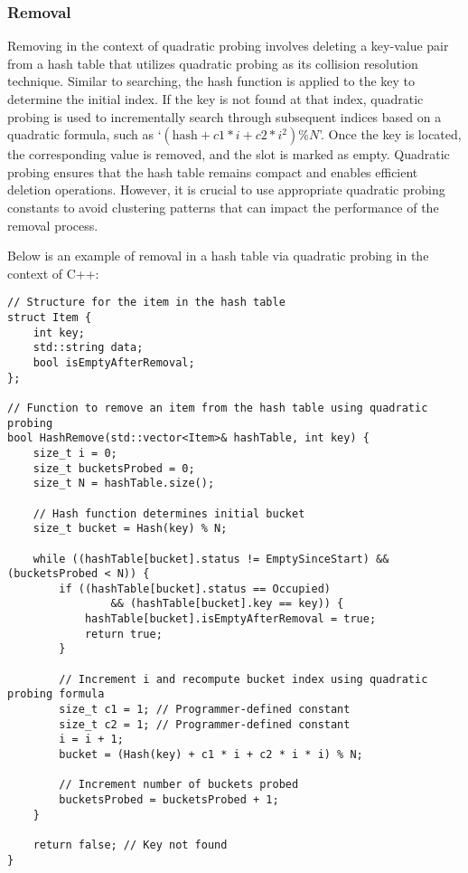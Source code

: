 \subsubsection{Removal}

Removing in the context of quadratic probing involves deleting a key-value pair from a hash table that utilizes quadratic probing as its collision resolution technique. Similar to searching, the hash 
function is applied to the key to determine the initial index. If the key is not found at that index, quadratic probing is used to incrementally search through subsequent indices based on a quadratic 
formula, such as `$(\text{hash} + c1 * i + c2 * i^2) \% N$'. Once the key is located, the corresponding value is removed, and the slot is marked as empty. Quadratic probing ensures that the hash table 
remains compact and enables efficient deletion operations. However, it is crucial to use appropriate quadratic probing constants to avoid clustering patterns that can impact the performance of the 
removal process.

\begin{solution}

Below is an example of removal in a hash table via quadratic probing in the context of C++:

\horizontalline

\begin{verbatim}
// Structure for the item in the hash table
struct Item {
    int key;
    std::string data;
    bool isEmptyAfterRemoval;
};

// Function to remove an item from the hash table using quadratic probing
bool HashRemove(std::vector<Item>& hashTable, int key) {
    size_t i = 0;
    size_t bucketsProbed = 0;
    size_t N = hashTable.size();

    // Hash function determines initial bucket
    size_t bucket = Hash(key) % N;

    while ((hashTable[bucket].status != EmptySinceStart) && (bucketsProbed < N)) {
        if ((hashTable[bucket].status == Occupied) 
                && (hashTable[bucket].key == key)) {
            hashTable[bucket].isEmptyAfterRemoval = true;
            return true;
        }

        // Increment i and recompute bucket index using quadratic probing formula
        size_t c1 = 1; // Programmer-defined constant
        size_t c2 = 1; // Programmer-defined constant
        i = i + 1;
        bucket = (Hash(key) + c1 * i + c2 * i * i) % N;

        // Increment number of buckets probed
        bucketsProbed = bucketsProbed + 1;
    }

    return false; // Key not found
}
\end{verbatim}

\horizontalline

\end{solution}

